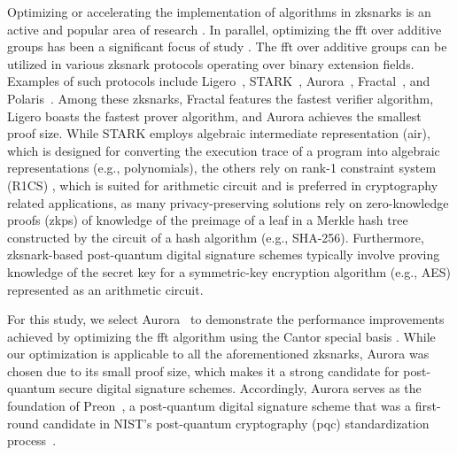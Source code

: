 Optimizing or accelerating the implementation of algorithms in \gls{zksnark}s is an active and popular area of research \cite{ECFFT1_2023,ECFFT_2022,Diamond2023Towers,CHES:LuoFuGong23}. In parallel, optimizing the \gls{fft} over additive groups has been a significant focus of study \cite{Cantor1989FFT,zurGathenFFT,Gao2010FFT,LCH-conv2016,LCH-FFT2016}. The \gls{fft} over additive groups can be utilized in various \gls{zksnark} protocols operating over binary extension fields. Examples of such protocols include Ligero~\cite{Ames2017Ligero}, STARK~\cite{Ben-Sasson2018STARK}, Aurora~\cite{Aurora2019}, Fractal~\cite{Chiesa2020Fractal}, and Polaris~\cite{Polaris}. Among these \gls{zksnark}s, Fractal features the fastest verifier algorithm, Ligero boasts the fastest prover algorithm, and Aurora achieves the smallest proof size. While STARK employs algebraic intermediate representation (\gls{air}), which is designed for converting the execution trace of a program into algebraic representations (e.g., polynomials), the others rely on rank-1 constraint system (R1CS) \cite{Gong2024}, which is suited for arithmetic circuit and is preferred in cryptography related applications, as many privacy-preserving solutions rely on zero-knowledge proofs (\gls{zkp}s) of knowledge of the preimage of a leaf in a Merkle hash tree constructed by the circuit of a hash algorithm (e.g., SHA-256). Furthermore, \gls{zksnark}-based post-quantum digital signature schemes typically involve proving knowledge of the secret key for a symmetric-key encryption algorithm (e.g., AES) represented as an arithmetic circuit.

For this study, we select Aurora~\cite{Aurora2019} to demonstrate the performance improvements achieved by optimizing the \gls{fft} algorithm using the Cantor special basis \cite{Cantor1989FFT}. While our optimization is applicable to all the aforementioned \gls{zksnark}s, Aurora was chosen due to its small proof size, which makes it a strong candidate for post-quantum secure digital signature schemes. Accordingly, Aurora serves as the foundation of Preon~\cite{Preon2023}, a post-quantum digital signature scheme that was a first-round candidate in NIST’s post-quantum cryptography (\gls{pqc}) standardization process~\cite{nist_pqc_round1_signatures}.

